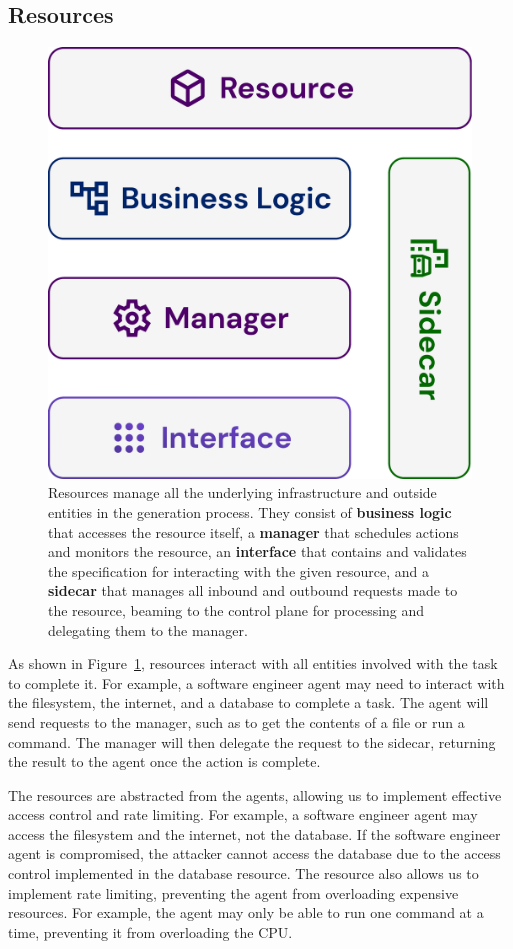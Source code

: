 \documentclass[a4paper,twocolumn,11pt]{quantumarticle}
\begin{document}
\subsection{Resources}
\begin{figure}[t]
  \includegraphics[width=\columnwidth]{figures/resource.pdf}
  \caption{Resources manage all the underlying infrastructure and outside entities in the generation process. They consist of \textbf{business logic} that accesses the resource itself, a \textbf{manager} that schedules actions and monitors the resource, an \textbf{interface} that contains and validates the specification for interacting with the given resource, and a \textbf{sidecar} that manages all inbound and outbound requests made to the resource, beaming to the control plane for processing and delegating them to the manager.}
  \label{fig:resources}
\end{figure}
As shown in Figure~\ref{fig:resources}, resources interact with all entities involved with the task to complete it. For example, a software engineer agent may need to interact with the filesystem, the internet, and a database to complete a task. The agent will send requests to the manager, such as to get the contents of a file or run a command. The manager will then delegate the request to the sidecar, returning the result to the agent once the action is complete.

The resources are abstracted from the agents, allowing us to implement effective access control and rate limiting. For example, a software engineer agent may access the filesystem and the internet, not the database. If the software engineer agent is compromised, the attacker cannot access the database due to the access control implemented in the database resource. The resource also allows us to implement rate limiting, preventing the agent from overloading expensive resources. For example, the agent may only be able to run one command at a time, preventing it from overloading the CPU.

\end{document}
